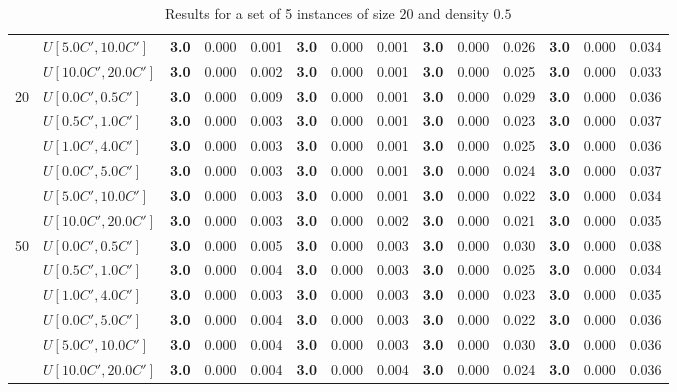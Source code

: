 \begin{table}[h]
{\begin{tabular}{|l|l||l|l|l||l|l|l||l|l|l||l|l|l|}
       & $U[5.0C',10.0C']$ & \textbf{3.0} & 0.000 & 0.001 & \textbf{3.0} & 0.000 & 0.001 & \textbf{3.0} & 0.000 & 0.026 & \textbf{3.0} & 0.000 & 0.034 \\
       & $U[10.0C',20.0C']$ & \textbf{3.0} & 0.000 & 0.002 & \textbf{3.0} & 0.000 & 0.001 & \textbf{3.0} & 0.000 & 0.025 & \textbf{3.0} & 0.000 & 0.033 \\
      \hline\hline
      \multirow{6}{*}{20} & $U[0.0C',0.5C']$ & \textbf{3.0} & 0.000 & 0.009 & \textbf{3.0} & 0.000 & 0.001 & \textbf{3.0} & 0.000 & 0.029 & \textbf{3.0} & 0.000 & 0.036 \\
       & $U[0.5C',1.0C']$ & \textbf{3.0} & 0.000 & 0.003 & \textbf{3.0} & 0.000 & 0.001 & \textbf{3.0} & 0.000 & 0.023 & \textbf{3.0} & 0.000 & 0.037 \\
       & $U[1.0C',4.0C']$ & \textbf{3.0} & 0.000 & 0.003 & \textbf{3.0} & 0.000 & 0.001 & \textbf{3.0} & 0.000 & 0.025 & \textbf{3.0} & 0.000 & 0.036 \\
       & $U[0.0C',5.0C']$ & \textbf{3.0} & 0.000 & 0.003 & \textbf{3.0} & 0.000 & 0.001 & \textbf{3.0} & 0.000 & 0.024 & \textbf{3.0} & 0.000 & 0.037 \\
       & $U[5.0C',10.0C']$ & \textbf{3.0} & 0.000 & 0.003 & \textbf{3.0} & 0.000 & 0.001 & \textbf{3.0} & 0.000 & 0.022 & \textbf{3.0} & 0.000 & 0.034 \\
       & $U[10.0C',20.0C']$ & \textbf{3.0} & 0.000 & 0.003 & \textbf{3.0} & 0.000 & 0.002 & \textbf{3.0} & 0.000 & 0.021 & \textbf{3.0} & 0.000 & 0.035 \\
      \hline\hline
      \multirow{6}{*}{50} & $U[0.0C',0.5C']$ & \textbf{3.0} & 0.000 & 0.005 & \textbf{3.0} & 0.000 & 0.003 & \textbf{3.0} & 0.000 & 0.030 & \textbf{3.0} & 0.000 & 0.038 \\
       & $U[0.5C',1.0C']$ & \textbf{3.0} & 0.000 & 0.004 & \textbf{3.0} & 0.000 & 0.003 & \textbf{3.0} & 0.000 & 0.025 & \textbf{3.0} & 0.000 & 0.034 \\
       & $U[1.0C',4.0C']$ & \textbf{3.0} & 0.000 & 0.003 & \textbf{3.0} & 0.000 & 0.003 & \textbf{3.0} & 0.000 & 0.023 & \textbf{3.0} & 0.000 & 0.035 \\
       & $U[0.0C',5.0C']$ & \textbf{3.0} & 0.000 & 0.004 & \textbf{3.0} & 0.000 & 0.003 & \textbf{3.0} & 0.000 & 0.022 & \textbf{3.0} & 0.000 & 0.036 \\
       & $U[5.0C',10.0C']$ & \textbf{3.0} & 0.000 & 0.004 & \textbf{3.0} & 0.000 & 0.003 & \textbf{3.0} & 0.000 & 0.030 & \textbf{3.0} & 0.000 & 0.036 \\
       & $U[10.0C',20.0C']$ & \textbf{3.0} & 0.000 & 0.004 & \textbf{3.0} & 0.000 & 0.004 & \textbf{3.0} & 0.000 & 0.024 & \textbf{3.0} & 0.000 & 0.036 \\
      \hline
      \end{tabular}
      }
      \caption{Results for a set of 5 instances of size $20$ and density $0.5$}
      \label{tab:pcpn20}\end{table}


